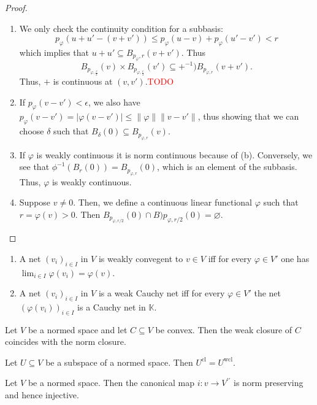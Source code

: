 \documentclass[prb,12pt]{revtex4-2}
\theoremstyle{definition}
\theoremstyle{definition}
\theoremstyle{definition}
\newenvironment{parts}{\begin{enumerate}[label=(\alph*)]}{\end{enumerate}}
\begin{document}
\begin{proof}
	\begin{parts}
		\item We only check the continuity condition for a subbasis:
		\[
		p_\varphi(u+u'-(v+v'))\le p_\varphi(u-v)+p_\varphi(u'-v')< r
		\]
		which implies that $u+u'\subseteq B_{p_{\varphi}, r}(v+v')$. Thus
		\[
		B_{p_{\varphi, \frac{r}{2}}}(v)\times B_{p_{\varphi, \frac{r}{2}}}(v')\subseteq +^{-1})B_{p_{\varphi, r}}(v+v')
		.\] 
		Thus, $+$ is continuous at $(v, v')$.\textcolor{red}{TODO}
		\item If $p_\varphi(v-v')<\epsilon$, we also have $p_\varphi(v-v')=|\varphi(v-v')| \le \| \varphi\| \|v-v'\|$, thus showing that we can choose $\delta$ such that $B_\delta(0)\subseteq B_{p_{\varphi, r}}(v)$.
		\item If  $\varphi$ is weakly continuous it is norm continuous because of (b). Conversely, we see that $\phi^{-1}(B_r(0))=B_{p_{\varphi,r}}(0)$, which is an element of the subbasis. Thus, $\varphi$ is weakly continuous.
		\item Suppose $v\neq 0$. Then, we define a continuous linear functional $\varphi$ such that $r=\varphi(v)>0$. Then $B_{p_{\varphi, r / 2}}(0)\cap B){p_{\varphi, r / 2}}(0)=\varnothing$.
	\end{parts}
\end{proof}
\begin{Theorem}
	\begin{parts}
		\item A net $(v_i)_{i\in I}$ in $V$ is weakly convegent to $v\in V$ iff for every $\varphi\in V'$ one has $\lim_{i \in I} \varphi(v_i)=\varphi(v)$.
		\item A net $(v_i)_{i\in I}$ in $V$ is a weak Cauchy net iff for every $\varphi \in V'$ the net $(\varphi(v_i))_{i\in I}$ is a Cauchy net in $\mathbb{K}$.
	\end{parts}
\end{Theorem}
\begin{Theorem}
	Let $V$ be a normed space and let $C\subseteq V$ be convex. Then the weak closure of $C$ coincides with the norm closure.
\end{Theorem}
\begin{Corollary}
	Let $U\subseteq V$ be a subspace of a normed space. Then $U^\text{cl}=U^\text{wcl}$.
\end{Corollary}
\begin{Theorem}
	Let $V$ be a normed space. Then the canonical map $i:v\to V^{\prime\prime}$ is norm preserving and hence injective.
\end{Theorem}
\end{document}
